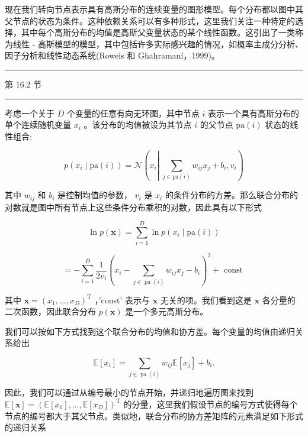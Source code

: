 \documentclass[10pt]{article}
\newcommand{\HRule}{\begin{center}\rule{0.9\linewidth}{0.2mm}\end{center}}
\begin{document}
现在我们转向节点表示具有高斯分布的连续变量的图形模型。每个分布都以图中其父节点的状态为条件。这种依赖关系可以有多种形式，这里我们关注一种特定的选择，其中每个高斯分布的均值是高斯父变量状态的某个线性函数。这引出了一类称为线性 - 高斯模型的模型，其中包括许多实际感兴趣的情况，如概率主成分分析、因子分析和线性动态系统(Roweis 和 Ghahramani，1999)。

\HRule

第 16.2 节

\HRule

考虑一个关于 \(D\) 个变量的任意有向无环图，其中节点 \(i\) 表示一个具有高斯分布的单个连续随机变量 \({x}_{i}\) 。该分布的均值被设为其节点 \(i\) 的父节点 \(\mathrm{{pa}}\left( i\right)\) 状态的线性组合:

\[
p\left( {{x}_{i} \mid  \mathrm{{pa}}\left( i\right) }\right)  = \mathcal{N}\left( {{x}_{i}\left| {\;\mathop{\sum }\limits_{{j \in  \mathrm{{pa}}\left( i\right) }}{w}_{ij}{x}_{j} + {b}_{i},{v}_{i}}\right. }\right)  \tag{11.9}
\]

其中 \({w}_{ij}\) 和 \({b}_{i}\) 是控制均值的参数， \({v}_{i}\) 是 \({x}_{i}\) 的条件分布的方差。那么联合分布的对数就是图中所有节点上这些条件分布乘积的对数，因此具有以下形式

\[
\ln p\left( \mathbf{x}\right)  = \mathop{\sum }\limits_{{i = 1}}^{D}\ln p\left( {{x}_{i} \mid  \mathrm{{pa}}\left( i\right) }\right)  \tag{11.10}
\]

\[
=  - \mathop{\sum }\limits_{{i = 1}}^{D}\frac{1}{2{v}_{i}}{\left( {x}_{i} - \mathop{\sum }\limits_{{j \in  \operatorname{pa}\left( i\right) }}{w}_{ij}{x}_{j} - {b}_{i}\right) }^{2} + \text{ const } \tag{11.11}
\]

其中 \(\mathbf{x} = {\left( {x}_{1},\ldots ,{x}_{D}\right) }^{\mathrm{T}}\) ，’const’ 表示与 \(\mathbf{x}\) 无关的项。我们看到这是 \(\mathbf{x}\) 各分量的二次函数，因此联合分布 \(p\left( \mathbf{x}\right)\) 是一个多元高斯分布。

我们可以按如下方式找到这个联合分布的均值和协方差。每个变量的均值由递归关系给出

\[
\mathbb{E}\left\lbrack  {x}_{i}\right\rbrack   = \mathop{\sum }\limits_{{j \in  \operatorname{pa}\left( i\right) }}{w}_{ij}\mathbb{E}\left\lbrack  {x}_{j}\right\rbrack   + {b}_{i}. \tag{11.12}
\]

因此，我们可以通过从编号最小的节点开始，并递归地遍历图来找到 \(\mathbb{E}\left\lbrack  \mathbf{x}\right\rbrack   = {\left( \mathbb{E}\left\lbrack  {x}_{1}\right\rbrack  ,\ldots ,\mathbb{E}\left\lbrack  {x}_{D}\right\rbrack  \right) }^{\mathrm{T}}\) 的分量，这里我们假设节点的编号方式使得每个节点的编号都大于其父节点。类似地，联合分布的协方差矩阵的元素满足如下形式的递归关系
\end{document}
